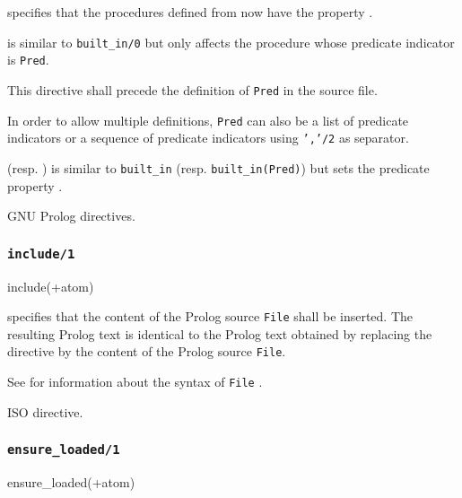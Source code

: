 \Description

 specifies that the procedures defined from
now have the  property .

 is similar to \texttt{built\_in/0} but
only affects the procedure whose predicate indicator is \texttt{Pred}.

This directive shall precede the definition of \texttt{Pred} in the source
file.

In order to allow multiple definitions, \texttt{Pred} can also be a list of
predicate indicators or a sequence of predicate indicators using
\texttt{','/2} as separator.

 (resp.
) is similar to
\texttt{built\_in} (resp. \texttt{built\_in(Pred)}) but sets the
 predicate property .

\Portability

GNU Prolog directives.

\subsubsection{\texttt{include/1}}

\begin{TemplatesOneCol}
include(+atom)

\end{TemplatesOneCol}

\Description

 specifies that the content of the Prolog source
\texttt{File} shall be inserted. The resulting Prolog text is identical to
the Prolog text obtained by replacing the directive by the content of the
Prolog source \texttt{File}.

See  for information about the syntax of
\texttt{File} .

\Portability

ISO directive.

\subsubsection{\texttt{ensure\_loaded/1}}

\begin{TemplatesOneCol}
ensure\_loaded(+atom)

\end{TemplatesOneCol}

